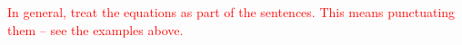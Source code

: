 \documentclass[codesnippet]{jss}
\newcommand{\class}[1]{`\code{#1}'}
\newcommand{\fct}[1]{\code{#1()}}
\newcommand{\RBnote}[1]{\textcolor{red}{#1}}
\begin{document}
\RBnote{In general, treat the equations as part of the sentences.  This means punctuating them -- see the examples above.}

%
%
\end{document}
